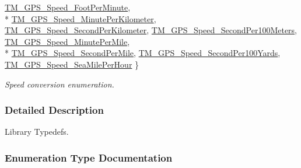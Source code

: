 \begin{DoxyCompactItemize}
\hyperlink{group___t_m___g_p_s___typedefs_gga287710c2af22ad207c305aeb2e6ea69caca28d20b31f9acfccddea72201900990}{T\+M\+\_\+\+G\+P\+S\+\_\+\+Speed\+\_\+\+Foot\+Per\+Minute}, 
\\*
\hyperlink{group___t_m___g_p_s___typedefs_gga287710c2af22ad207c305aeb2e6ea69ca187ab5ccabceea49806e0087310a0526}{T\+M\+\_\+\+G\+P\+S\+\_\+\+Speed\+\_\+\+Minute\+Per\+Kilometer}, 
\hyperlink{group___t_m___g_p_s___typedefs_gga287710c2af22ad207c305aeb2e6ea69ca82bb6c59d53a37fd3623a3e0c907191f}{T\+M\+\_\+\+G\+P\+S\+\_\+\+Speed\+\_\+\+Second\+Per\+Kilometer}, 
\hyperlink{group___t_m___g_p_s___typedefs_gga287710c2af22ad207c305aeb2e6ea69ca829c2987922941e5721d646582f41250}{T\+M\+\_\+\+G\+P\+S\+\_\+\+Speed\+\_\+\+Second\+Per100\+Meters}, 
\hyperlink{group___t_m___g_p_s___typedefs_gga287710c2af22ad207c305aeb2e6ea69ca6c9926f1f34d278a00a906dffdb99d63}{T\+M\+\_\+\+G\+P\+S\+\_\+\+Speed\+\_\+\+Minute\+Per\+Mile}, 
\\*
\hyperlink{group___t_m___g_p_s___typedefs_gga287710c2af22ad207c305aeb2e6ea69ca00528ff967638958ffb9626e1d7d39cf}{T\+M\+\_\+\+G\+P\+S\+\_\+\+Speed\+\_\+\+Second\+Per\+Mile}, 
\hyperlink{group___t_m___g_p_s___typedefs_gga287710c2af22ad207c305aeb2e6ea69caf5eac61ada8ba14a5625dfcb0dab2506}{T\+M\+\_\+\+G\+P\+S\+\_\+\+Speed\+\_\+\+Second\+Per100\+Yards}, 
\hyperlink{group___t_m___g_p_s___typedefs_gga287710c2af22ad207c305aeb2e6ea69ca85c2c26ba761dd152a3b685dca8c6d8d}{T\+M\+\_\+\+G\+P\+S\+\_\+\+Speed\+\_\+\+Sea\+Mile\+Per\+Hour}
 \}
\begin{DoxyCompactList}\small\item\em Speed conversion enumeration. \end{DoxyCompactList}\end{DoxyCompactItemize}


\subsubsection{Detailed Description}
Library Typedefs. 



\subsubsection{Enumeration Type Documentation}
\hypertarget{group___t_m___g_p_s___typedefs_gaf3a9184315a145cb8288691c9c529427}{}
